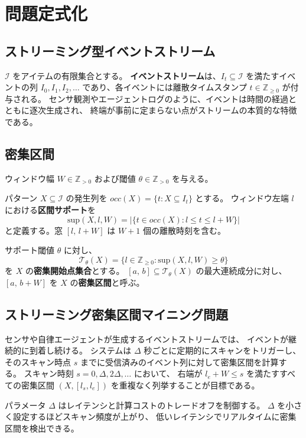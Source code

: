 \section{問題定式化}

\subsection{ストリーミング型イベントストリーム}

$\mathcal{I}$ をアイテムの有限集合とする。
\textbf{イベントストリーム}は、$I_t \subseteq \mathcal{I}$ を満たすイベントの列
$I_0, I_1, I_2, \ldots$ であり、各イベントには離散タイムスタンプ $t \in \mathbb{Z}_{\geq 0}$ が付与される。
センサ観測やエージェントログのように、イベントは時間の経過とともに逐次生成され、
終端が事前に定まらない点がストリームの本質的な特徴である。

\subsection{密集区間}

ウィンドウ幅 $W \in \mathbb{Z}_{>0}$ および閾値 $\theta \in \mathbb{Z}_{>0}$ を与える。

\begin{definition}[区間サポート]
パターン $X \subseteq \mathcal{I}$ の発生列を
$\mathit{occ}(X) = \{t : X \subseteq I_t\}$ とする。
ウィンドウ左端 $l$ における\textbf{区間サポート}を
\[
  \mathrm{sup}(X, l, W) = |\{t \in \mathit{occ}(X) : l \leq t \leq l + W\}|
\]
と定義する。窓 $[l,\, l{+}W]$ は $W{+}1$ 個の離散時刻を含む。
\end{definition}

\begin{definition}[密集開始点集合と密集区間]
サポート閾値 $\theta$ に対し、
\[
  \mathcal{T}_\theta(X) = \{l \in \mathbb{Z}_{\geq 0} : \mathrm{sup}(X, l, W) \geq \theta\}
\]
を $X$ の\textbf{密集開始点集合}とする。
$[a,\, b] \subseteq \mathcal{T}_\theta(X)$ の最大連続成分に対し、
$[a,\, b{+}W]$ を $X$ の\textbf{密集区間}と呼ぶ。
\end{definition}

\subsection{ストリーミング密集区間マイニング問題}

センサや自律エージェントが生成するイベントストリームでは、
イベントが継続的に到着し続ける。
システムは $\Delta$ 秒ごとに定期的にスキャンをトリガーし、
そのスキャン時点 $s$ までに受信済みのイベント列に対して密集区間を計算する。
スキャン時刻 $s = 0, \Delta, 2\Delta, \ldots$ において、
右端が $l_e + W \leq s$ を満たすすべての密集区間 $(X, [l_s, l_e])$ を重複なく列挙することが目標である。

パラメータ $\Delta$ はレイテンシと計算コストのトレードオフを制御する。
$\Delta$ を小さく設定するほどスキャン頻度が上がり、
低いレイテンシでリアルタイムに密集区間を検出できる。
